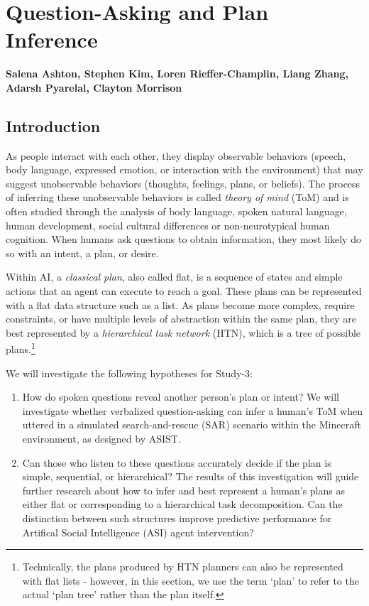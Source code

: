 \chapter{Question-Asking and Plan Inference}
\label{ch:question_plan}
\textbf{Salena Ashton, Stephen Kim, Loren Rieffer-Champlin, Liang Zhang,
Adarsh Pyarelal, Clayton Morrison}

\section{Introduction}

As people interact with each other, they display observable behaviors (speech,
body language, expressed emotion, or interaction with the environment) that may
suggest unobservable behaviors (thoughts, feelings, plans, or beliefs). The
process of inferring these unobservable behaviors is called \emph{theory of
mind} (ToM) and is often studied through the analysis of body language, spoken
natural language, human development, social cultural differences or
non-neurotypical human cognition. When humans ask questions to obtain
information, they most likely do so with an intent, a plan, or desire.

Within AI, a \emph{classical plan}, also called flat, is a sequence of states
and simple actions that an agent can execute to reach a goal. These plans can
be represented with a flat data structure such as a list. As plans become more
complex, require constraints, or have multiple levels of abstraction within the
same plan, they are best represented by a \emph{hierarchical task network}
(HTN), which is a tree of possible plans.\footnote{Technically, the plans
    produced by HTN planners can also be represented with flat lists - however,
    in this section, we use the term `plan' to refer to the actual `plan tree'
rather than the plan itself.}

We will investigate the following hypotheses for Study-3:

\begin{enumerate}

    \item How do spoken questions reveal another person’s plan or intent? We
        will investigate whether verbalized question-asking can infer a human’s
        ToM when uttered in a simulated search-and-rescue (SAR) scenario within
        the Minecraft environment, as designed by ASIST.

    \item Can those who listen to these questions accurately decide if the plan
        is simple, sequential, or hierarchical? The results of this
        investigation will guide further research about how to infer and best
        represent a human's plans as either flat or corresponding to a
        hierarchical task decomposition. Can the distinction between such
        structures improve predictive performance for Artifical Social
        Intelligence (ASI) agent intervention?

\end{enumerate}


